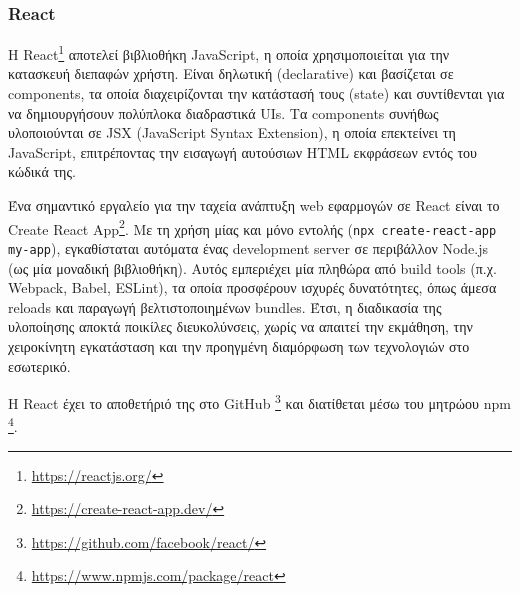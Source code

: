 \subsubsection{React} \label{subsection:4-2-2-1-react}


Η React\footnote{\url{https://reactjs.org/}} αποτελεί βιβλιοθήκη JavaScript, η οποία χρησιμοποιείται για την κατασκευή διεπαφών χρήστη. Είναι δηλωτική (declarative) και βασίζεται σε components, τα οποία διαχειρίζονται την κατάστασή τους (state) και συντίθενται για να δημιουργήσουν πολύπλοκα διαδραστικά UIs. Τα components συνήθως υλοποιούνται σε JSX (JavaScript Syntax Extension), η οποία επεκτείνει τη JavaScript, επιτρέποντας την εισαγωγή αυτούσιων HTML εκφράσεων εντός του κώδικά της.

Ένα σημαντικό εργαλείο για την ταχεία ανάπτυξη web εφαρμογών σε React είναι το Create React App\footnote{\url{https://create-react-app.dev/}}. Με τη χρήση μίας και μόνο εντολής (\texttt{npx create-react-app my-app}), εγκαθίσταται αυτόματα ένας development server σε περιβάλλον Node.js (ως μία μοναδική βιβλιοθήκη). Αυτός εμπεριέχει μία πληθώρα από build tools (π.χ. Webpack, Babel, ESLint), τα οποία προσφέρουν ισχυρές δυνατότητες, όπως άμεσα reloads και παραγωγή βελτιστοποιημένων bundles. Έτσι, η διαδικασία της υλοποίησης αποκτά ποικίλες διευκολύνσεις, χωρίς να απαιτεί την εκμάθηση, την χειροκίνητη εγκατάσταση και την προηγμένη διαμόρφωση των τεχνολογιών στο εσωτερικό. 

Η React έχει το αποθετήριό της στο GitHub \footnote{\url{https://github.com/facebook/react/}} και διατίθεται μέσω του μητρώου npm \footnote{\url{https://www.npmjs.com/package/react}}.
